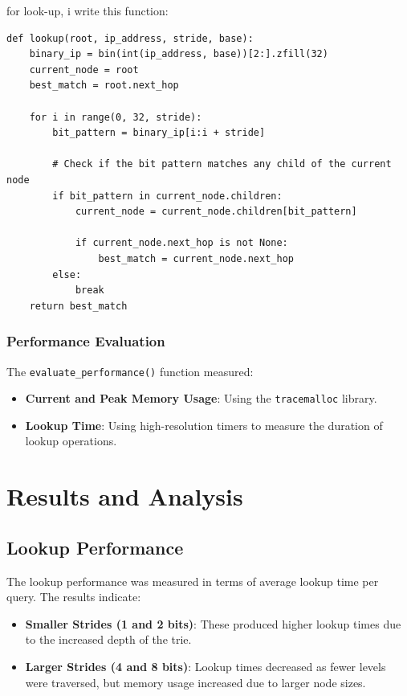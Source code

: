 \documentclass[12pt	]{article}
\begin{document}
for look-up, i write this function:

\begin{lstlisting}[style=pythonstyle, caption={Lookup Function}]
def lookup(root, ip_address, stride, base):
	binary_ip = bin(int(ip_address, base))[2:].zfill(32)
	current_node = root
	best_match = root.next_hop
	
	for i in range(0, 32, stride):
		bit_pattern = binary_ip[i:i + stride]
		
		# Check if the bit pattern matches any child of the current node
		if bit_pattern in current_node.children:
			current_node = current_node.children[bit_pattern]
		
			if current_node.next_hop is not None:
				best_match = current_node.next_hop
		else:
			break  
	return best_match
\end{lstlisting}




\subsubsection{Performance Evaluation}
The \texttt{evaluate\_performance()} function measured:
\begin{itemize}
	\item \textbf{Current and Peak Memory Usage}: Using the \texttt{tracemalloc} library.
	\item \textbf{Lookup Time}: Using high-resolution timers to measure the duration of lookup operations.
\end{itemize}




\section{Results and Analysis}

\subsection{Lookup Performance}
The lookup performance was measured in terms of average lookup time per query. The results indicate:
\begin{itemize}
	\item \textbf{Smaller Strides (1 and 2 bits)}: These produced higher lookup times due to the increased depth of the trie.
	\item \textbf{Larger Strides (4 and 8 bits)}: Lookup times decreased as fewer levels were traversed, but memory usage increased due to larger node sizes.
\end{itemize}
\end{document}
